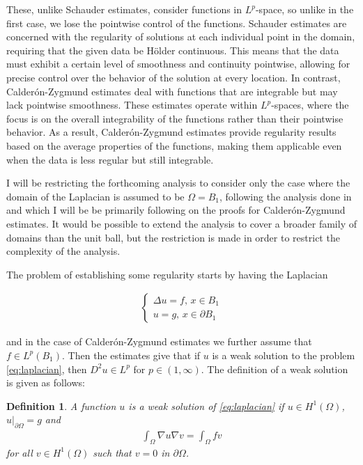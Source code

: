 \documentclass[12pt]{artikel1}
\newtheorem{definition}{Definition}[section]
\begin{document}
These, unlike Schauder estimates, consider functions in $L^p$-space, so unlike in the first case, we lose the pointwise control of the functions.  Schauder estimates are concerned with the regularity of solutions at each individual point in the domain, requiring that the given data be Hölder continuous. This means that the data must exhibit a certain level of smoothness and continuity pointwise, allowing for precise control over the behavior of the solution at every location. In contrast, Calderón-Zygmund estimates deal with functions that are integrable but may lack pointwise smoothness. These estimates operate within $L^p$-spaces, where the focus is on the overall integrability of the functions rather than their pointwise behavior. As a result, Calderón-Zygmund estimates provide regularity results based on the average properties of the functions, making them applicable even when the data is less regular but still integrable.

I will be restricting the forthcoming analysis to consider only the case where the domain of the Laplacian is assumed to be $\Omega=B_1$, following the analysis done in \cite{covi,Fern_ndez_Real_2022} and \cite{sanpera} which I will be be primarily following on the proofs for Calder\'{o}n-Zygmund estimates. It would be possible to extend the analysis to cover a broader family of domains than the unit ball, but the restriction is made in order to restrict the complexity of the analysis.

The problem of establishing some regularity starts by having the Laplacian

\begin{gather}\label{eq:laplacian}
    \begin{cases}
        \Delta u=f,\,x\in B_1 \\
        u=g,\,x\in\partial B_1
    \end{cases}
\end{gather}

\noindent and in the case of Calder\'{o}n-Zygmund estimates we further assume that $f\in L^{p}(B_1)$. Then the estimates give that if $u$ is a weak solution to the problem \ref{eq:laplacian}, then $D^2u\in L^p$ for $p\in (1,\infty)$. The definition of a weak solution is given as follows:

\begin{definition}\label{def:weak}
    A function $u$ is a weak solution of \ref{eq:laplacian} if $u\in H^1(\Omega)$, $u|_{\partial\Omega}=g$ and 
    \begin{gather*}
        \int_\Omega\nabla u\nabla v=\int_\Omega fv
    \end{gather*}
    for all $v\in H^1(\Omega)$ such that $v=0$ in $\partial\Omega$.
\end{definition}
\end{document}
